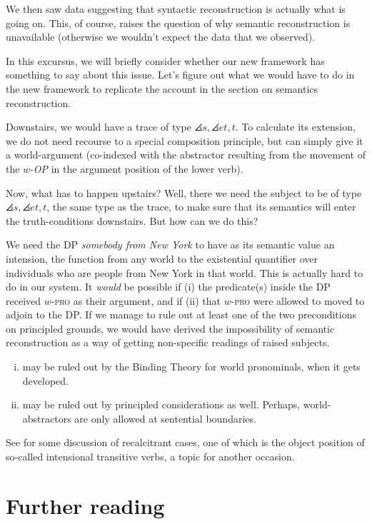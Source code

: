 We then saw data suggesting that syntactic reconstruction is actually what is
going on. This, of course, raises the question of why semantic reconstruction is
unavailable (otherwise we wouldn't expect the data that we observed).

In this excursus, we will briefly consider whether our new framework has
something to say about this issue. Let's figure out what we would have to do in
the new framework to replicate the account in the section on semantics
reconstruction.

Downstairs, we would have a trace of type $\angles{s,\angles{et,t}}$. To
calculate its extension, we do not need recourse to a special composition
principle, but can simply give it a world-argument (co-indexed with the
abstractor resulting from the movement of the $w$-\emph{OP} in the argument
position of the lower verb).

Now, what has to happen upstairs? Well, there we need the subject to be of type
$\angles{s,\angles{et,t}}$, the same type as the trace, to make sure that its
semantics will enter the truth-conditions downstairs. But how can we do this?

We need the DP \emph{somebody from New York} to have as its semantic value an
intension, the function from any world to the existential quantifier over
individuals who are people from New York in that world. This is actually hard to
do in our system. It \emph{would} be possible if (i) the predicate(s) inside the
DP received $w$-\textsc{pro} as their argument, and if (ii) that
$w$-\textsc{pro} were allowed to moved to adjoin to the DP. If we manage to rule
out at least one of the two preconditions on principled grounds, we would have
derived the impossibility of semantic reconstruction as a way of getting
non-specific readings of raised subjects.

\begin{enumerate}[(i)] 
\item may be ruled out by the Binding Theory for world pronominals, when it gets
  developed.
\item may be ruled out by principled considerations as well. Perhaps,
  world-abstractors are only allowed at sentential boundaries.
\end{enumerate}
%
See \citet{larson:grammar-intensionality} for some discussion of recalcitrant
cases, one of which is the object position of so-called intensional transitive
verbs, a topic for another occasion.

\section{Further reading}

